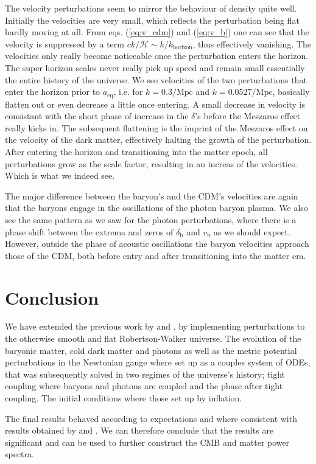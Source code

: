 \documentclass[twocolumn]{aastex62}
\begin{document}
The velocity perturbations seem to mirror the behaviour of density quite well. Initially the velocities are very small, which reflects the perturbation being flat hardly moving at all. From eqs. (\ref{eq:v_cdm}) and (\ref{eq:v_b}) one can see that the velocity is suppressed by a term $ck / \mathcal{H}\sim k / k_\text{horizon}$, thus effectively vanishing. The velocities only really become noticeable once the perturbation enters the horizon. The super horizon scales never really pick up speed and remain small essentially the entire history of the universe. We see velocities of the two perturbations that enter the horizon prior to $a_\text{eq}$, i.e. for $k = 0.3 /\mathrm{Mpc}$ and $k = 0.0527/\mathrm{Mpc}$, basically flatten out or even decrease a little once entering. A small decrease in velocity is consistant with the short phase of increase in the $\delta$'s before the Meszaros effect really kicks in. The subsequent flattening is the imprint of the Meszaros effect on the velocity of the dark matter, effectively halting the growth of the perturbation. After entering the horizon and transitioning into the matter epoch, all perturbations grow as the scale factor, resulting in an increas of the velocities. Which is what we indeed see.

The major difference between the baryon's and the CDM's velocities are again that the baryons engage in the oscillations of the photon baryon plasma. We also see the same pattern as we saw for the photon perturbations, where there is a phase shift between the extrema and zeros of $\delta_\text{b}$ and $v_\text{b}$ as we should expect. However, outside the phase of acoustic oscillations the baryon velocities approach those of the CDM, both before entry and after transitioning into the matter era.

\section{Conclusion} \label{sec:Conclusion}
We have extended the previous work by \cite{stutzer:2020a} and \cite{stutzer:2020b}, by implementing perturbations to the otherwise smooth and flat Robertson-Walker universe. The evolution of the baryonic matter, cold dark matter and photons as well as the metric potential perturbations in the Newtonian gauge where set up as a couples system of ODEs, that was subsequently solved in two regimes of the universe's history; tight coupling where baryons and photons are coupled and the phase after tight coupling. The initial conditions where those set up by inflation. 

The final results behaved according to expectations and where consistent with results obtained by \cite{winther:2020b} and \cite{dodelson:2003}. We can therefore conclude that the results are significant and can be used to further construct the CMB and matter power spectra.

\newpage


\end{document}

